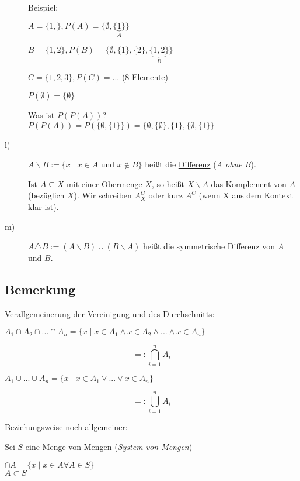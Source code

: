 \documentclass[a4paper, 12pt, twoside] {article}
\begin{document}
\begin{description}
	Beispiel:

	$A = \{1,\}, P(A) = \{\emptyset, \{ \underbrace{1}_{A}\}\}$

	$B = \{1, 2\}, P(B) = \{ \emptyset, \{1\}, \{2\}, \{ \underbrace{1, 2}_{B}\}\}$

	$C = \{1, 2, 3\}, P(C) = ...$ (8 Elemente)

	$P(\emptyset) = \{ \emptyset \}$

	Was ist $P (P(A))$? \\
	$P(P(A)) = P(\{ \emptyset, \{ 1 \}\}) = \{ \emptyset, \{ \emptyset \}, \{1 \}, \{ \emptyset, \{ 1 \}\}$ %

\item[l)]
	$A \backslash B := \{ x \mid x \in A$ und $x \notin B \}$ heißt die \underline{Differenz} (\textit{A ohne B}).

	Ist $A \subseteq X$ mit einer Obermenge $X$, so heißt $X \backslash A$ das \underline{Komplement} von $A$ (bezüglich $X$).
	Wir schreiben $A^C_X$ oder kurz $A^C$ (wenn X aus dem Kontext klar ist).


\item[m)]
	$A \triangle B := (A \backslash B) \cup (B \backslash A)$ heißt die symmetrische Differenz von $A$ und $B$. %


\end{description}

\subsection[Bemerkung (Verallgemeinerung von Vereinigung und Durchschnitt)]{Bemerkung} %
Verallgemeinerung der Vereinigung und des Durchschnitts:

$A_1 \cap A_2 \cap ... \cap A_n = \{x \mid x \in A_1 \wedge x \in A_2 \wedge ... \wedge x \in A_n\}$

$$=: \bigcap_{i = 1}^{n} A_i$$

$A_1 \cup ... \cup A_n = \{x \mid x \in A_1 \lor  ... \lor x \in A_n\}$

$$=: \bigcup_{i = 1}^{n} A_i$$

Beziehungsweise noch allgemeiner:

Sei $S$ eine Menge von Mengen (\textit{System von Mengen})

$\cap A = \{ x \mid x \in A \forall A \in S\} $ \\
$ A \subset S$
\end{document}

